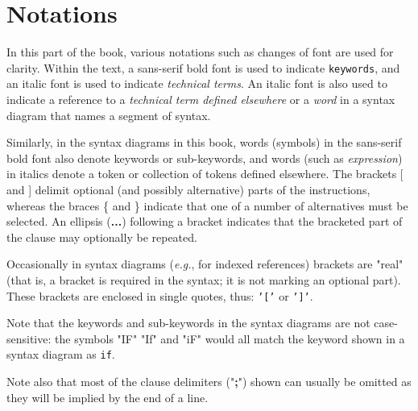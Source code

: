 \chapter{Notations}\label{refnotat}
 
In this part of the
book,
various notations such as changes of font are used for clarity.
Within the text, a
sans-serif bold font is used to indicate \texttt{keywords}, and an italic
font is used to indicate \emph{technical terms}.
An italic font is also used to indicate a reference to a
\emph{technical term defined elsewhere} or a \emph{word} in a
syntax diagram that names a segment of syntax.
 
Similarly, in the syntax diagrams in this
book,
words (symbols) in the
sans-serif
bold font also denote keywords or
sub-keywords, and words (such as \emph{expression}) in italics
denote a token or collection of tokens defined elsewhere.
The brackets [ and ] delimit optional (and possibly
alternative) parts of the instructions, whereas the braces \{
and \} indicate that one of a number of alternatives must be
selected.
An ellipsis (\textbf{...}) following a bracket indicates that
the bracketed part of the clause may optionally be repeated.
 
Occasionally in syntax diagrams (\emph{e.g.}, for indexed references)
brackets are "real" (that is, a bracket is required in the
syntax; it is not marking an optional part).
These brackets are enclosed in single quotes, thus:
\texttt{'['} or \texttt{']'}.
 
Note that the keywords and sub-keywords in the syntax diagrams are not
case-sensitive: the symbols "IF" "If" and "iF" would
all match the keyword shown in a syntax diagram as \texttt{if}.
 
Note also that most of the clause delimiters ("\textbf{;}") shown
can usually be omitted as they will be implied by the end of a line.
